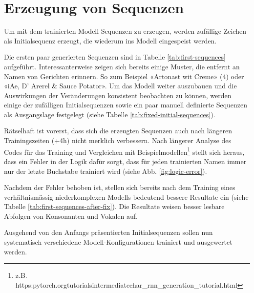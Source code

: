 \section{Erzeugung von Sequenzen}
\label{sec:model-generation}

Um mit dem trainierten Modell Sequenzen zu erzeugen, werden zufällige Zeichen als Initialsequenz erzeugt, die
wiederum ins Modell eingespeist werden.

Die ersten paar generierten Sequenzen sind in Tabelle \ref{tab:first-sequences} aufgeführt.
Interessanterweise zeigen sich bereits einige Muster, die entfernt an Namen von Gerichten erinnern.
So zum Beispiel «Artonast wit Creme» (4) oder «iAe, D' Arerel \& Sauce Potator».
Um das Modell weiter auszubauen und die Auswirkungen der Veränderungen konsistent beobachten zu können,
werden einige der zufälligen Initialsequenzen sowie ein paar manuell definierte Sequenzen als Ausgangslage
festgelegt (siehe Tabelle \ref{tab:fixed-initial-sequences}).

Rätselhaft ist vorerst, dass sich die erzeugten Sequenzen auch nach längeren Trainingszeiten (+4h) nicht merklich verbessern.
Nach längerer Analyse des Codes für das Training und Vergleichen mit Beispielmodellen\footnote{z.B. https:\/\/pytorch.org\/tutorials\/intermediate\/char\_rnn\_generation\_tutorial.html}
stellt sich heraus, dass ein Fehler in der Logik dafür sorgt, dass für jeden trainierten Namen immer nur der letzte Buchstabe trainiert wird (siehe Abb. \ref{fig:logic-error}).

Nachdem der Fehler behoben ist, stellen sich bereits nach dem Training eines verhältnismässig niederkomplexen Modells bedeutend bessere Resultate ein (siehe Tabelle \ref{tab:first-sequences-after-fix}).
Die Resultate weisen besser lesbare Abfolgen von Konsonanten und Vokalen auf.

Ausgehend von den Anfangs präsentierten Initialsequenzen sollen nun systematisch verschiedene Modell-Konfigurationen trainiert und
ausgewertet werden.
